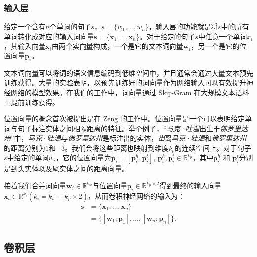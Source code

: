 \subsubsection{输入层}
 
给定一个含有$n$个单词的句子$s$，$s = \{ w_1, \ldots , w_n\}$，输入层的功能就是将$s$中的所有单词转化成对应的输入词向量$\mathbf{s} = \{ \mathbf{x}_1, \ldots , \mathbf{x}_n \}$。对于给定的句子$s$中任意一个单词$x_i$，其输入向量$\mathbf{x}_i$由两个实向量构成，一个是它的文本词向量$\mathbf{w}_i$，另一个是它的位置向量$\mathbf{p}_{i}$。

文本词向量可以将词的语义信息编码到低维空间中，并且通常会通过大量文本预先训练获得。大量的实验表明，以预先训练好的词向量作为网络输入可以有效提升神经网络的模型效果。在我们的工作中，词向量通过 Skip-Gram \cite{mikolov2013efficient}在大规模文本语料上提前训练获得。

位置向量的概念首次被提出是在 Zeng \cite{zeng2014relation} 的工作中。位置向量是一个可以表明给定单词与句子标注实体之间相隔距离的特征。举个例子，``\emph{马克·吐温}出生于\emph{佛罗里达州}''中，\emph{马克·吐温}与\emph{佛罗里达州}是标注出的实体，\emph{出}离\emph{马克·吐温}和\emph{佛罗里达州}的距离分别为$1$和$-3$。我们会将这些距离也映射到维度$k_p$的连续空间上。对于句子$s$中给定的单词$w_i$，它的位置向量为$\mathbf{p}_i = [\mathbf{p}^h_i, \mathbf{p}^t_i]$, $\mathbf{p}^h_i, \mathbf{p}^t_i \in \mathbb{R}^{k_p}$，其中$\mathbf{p}^h_i$ 和 $\mathbf{p}^t_i$分别是到头实体以及尾实体之间的距离向量。

接着我们合并词向量$\mathbf{w}_i \in \mathbb{R}^{k_w} $与位置向量$\mathbf{p}_i \in \mathbb{R}^{k_p \times 2} $得到最终的输入向量$\mathbf{x}_i \in \mathbb{R}^{k_i} (k_i = k_w + k_p \times 2)$，从而卷积神经网络的输入为：
\begin{align}
\mathbf{s} & = \{\mathbf{x}_1,\ldots, \mathbf{x}_n\} \\\nonumber
&=\{[\mathbf{w}_1;\mathbf{p}_1],\ldots, [\mathbf{w}_n;\mathbf{p}_n]\}.
\end{align}




\subsection{卷积层}

